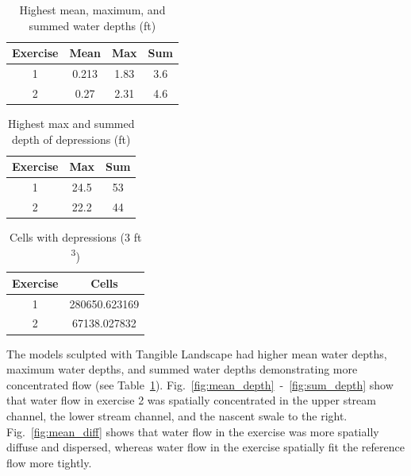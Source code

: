 \documentclass{isprs}
\begin{document}
\begin{table}[h!]
\caption{Highest mean, maximum, and summed water depths (ft)}
\vspace*{0.5em}
\centering
\begin{tabular}{c | c c c}
Exercise & Mean & Max & Sum\\
\hline
1 & 0.213 & 1.83 & 3.6\\
2 & 0.27 & 2.31 & 4.6\\ 
\end{tabular}
\label{table:water_depth} 
\end{table}

\begin{table}[h!]
\caption{Highest max and summed depth of depressions (ft)}
\vspace*{0.5em}
\centering
\begin{tabular}{c | c c}
Exercise & Max & Sum \\
\hline
1 & 24.5 & 53\\
2 & 22.2 & 44\\ 
\end{tabular}
\label{table:depressions} 
\end{table}

\begin{table}[h!]
\caption{Cells with depressions (3 ft \textsuperscript{3})} 
\vspace*{0.5em}
\centering
\begin{tabular}{c | c}
Exercise & Cells\\
\hline
1 & 280650.623169\\
2 & 67138.027832\\ 
\end{tabular}
\label{table:cells} 
\end{table}

The models sculpted with Tangible Landscape had higher 
mean water depths, 
maximum water depths, and 
summed water depths
demonstrating more concentrated flow
(see Table~\ref{table:water_depth}).
%
Fig.~\ref{fig:mean_depth}~-~\ref{fig:sum_depth} 
show that water flow in exercise 2 was
spatially concentrated 
in the upper stream channel, 
the lower stream channel, 
and the nascent swale to the right.
%
%
Fig.~\ref{fig:mean_diff} 
shows that water flow in the  exercise was more spatially diffuse and dispersed, 
whereas water flow in the  exercise spatially fit the reference flow more tightly.
\end{document}

